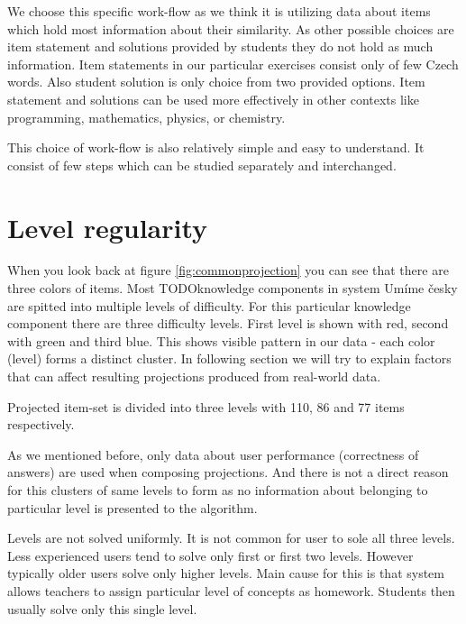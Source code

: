 \documentclass[
  digital, %
  table,   %
  nolof,     %
  nolot,     %
  nocover
]{fithesis3}
\begin{document}

We choose this specific work-flow as we think it is utilizing data about
items which hold most information about their similarity. As other
possible choices are item statement and solutions provided by students
they do not hold as much information. Item statements in our particular
exercises consist only of few Czech words. Also student solution is only
choice from two provided options. Item statement and solutions can be
used more effectively in other contexts like programming, mathematics,
physics, or chemistry.

This choice of work-flow is also relatively simple and easy to
understand. It consist of few steps which can be studied separately and
interchanged.

\section{Level regularity}\label{level-regularity}


When you look back at figure \ref{fig:commonprojection} you can see that
there are three colors of items. Most TODOknowledge components in system
Umíme česky are spitted into multiple levels of difficulty. For this
particular knowledge component there are three difficulty levels. First
level is shown with red, second with green and third blue. This shows
visible pattern in our data - each color (level) forms a distinct
cluster. In following section we will try to explain factors that can
affect resulting projections produced from real-world data.

Projected item-set is divided into three levels with 110, 86 and 77 items respectively.

As we mentioned before, only data about user performance (correctness of
answers) are used when composing projections. And there is not a direct
reason for this clusters of same levels to form as no information about
belonging to particular level is presented to the algorithm.


Levels are not solved uniformly. It is not common for user to sole all
three levels. Less experienced users tend to solve only first or first
two levels. However typically older users solve only higher levels. Main
cause for this is that system allows teachers to assign particular level
of concepts as homework. Students then usually solve only this single
level.
\end{document}
